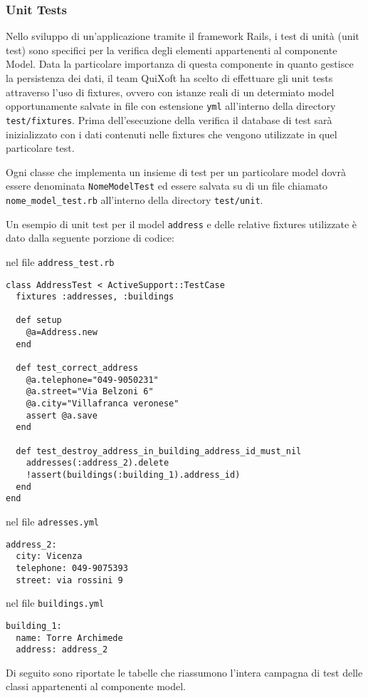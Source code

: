 \documentclass[11pt,a4paper]{article}
\begin{document}
\subsubsection{Unit Tests}
Nello sviluppo di un'applicazione tramite il framework Rails, i test di unità (unit test) sono specifici per la verifica degli elementi appartenenti al componente Model. Data la particolare importanza di questa componente in quanto gestisce la persistenza dei dati, il team QuiXoft ha scelto di effettuare gli unit tests attraverso l'uso di fixtures, ovvero con istanze reali di un determiato model opportunamente salvate in file con estensione \verb|yml| all'interno della directory \verb|test/fixtures|. Prima dell'esecuzione della verifica il database di test sarà inizializzato con i dati contenuti nelle fixtures che vengono utilizzate in quel particolare test.

Ogni classe che implementa un insieme di test per un particolare model dovrà essere denominata \verb|NomeModelTest| ed essere salvata su di un file chiamato \verb|nome_model_test.rb| all'interno della directory \verb|test/unit|.

Un esempio di unit test per il model \verb|address| e delle relative fixtures utilizzate è dato dalla seguente porzione di codice:

nel file \verb|address_test.rb|
\begin{verbatim}
class AddressTest < ActiveSupport::TestCase
  fixtures :addresses, :buildings

  def setup
    @a=Address.new
  end
  
  def test_correct_address
    @a.telephone="049-9050231"
    @a.street="Via Belzoni 6"
    @a.city="Villafranca veronese"
    assert @a.save
  end

  def test_destroy_address_in_building_address_id_must_nil
    addresses(:address_2).delete
    !assert(buildings(:building_1).address_id)
  end
end
\end{verbatim}

nel file \verb|adresses.yml|
\begin{verbatim}
address_2:
  city: Vicenza
  telephone: 049-9075393
  street: via rossini 9
\end{verbatim}

nel file \verb|buildings.yml|
\begin{verbatim}
building_1:
  name: Torre Archimede
  address: address_2
\end{verbatim}


Di seguito sono riportate le tabelle che riassumono l'intera campagna di test delle classi appartenenti al componente model.
\end{document}
